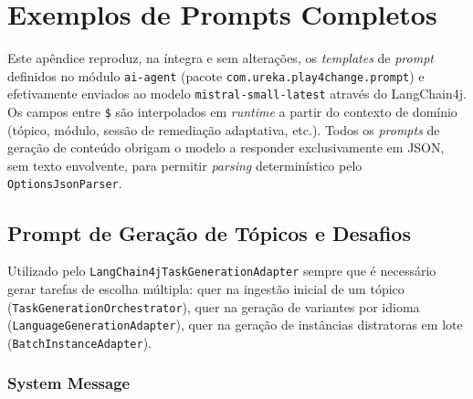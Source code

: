 %
%
\chapter{Exemplos de Prompts Completos} \label{ap:prompts}

Este apêndice reproduz, na íntegra e sem alterações, os \textit{templates} de \textit{prompt} definidos no módulo \texttt{ai-agent} (pacote \texttt{com.ureka.play4change.prompt}) e efetivamente enviados ao modelo \texttt{mistral-small-latest} através do LangChain4j. Os campos entre \texttt{\$} são interpolados em \textit{runtime} a partir do contexto de domínio (tópico, módulo, sessão de remediação adaptativa, etc.). Todos os \textit{prompts} de geração de conteúdo obrigam o modelo a responder exclusivamente em JSON, sem texto envolvente, para permitir \textit{parsing} determinístico pelo \texttt{OptionsJsonParser}.

\section{Prompt de Geração de Tópicos e Desafios} \label{ap:prompt-task-generation}

Utilizado pelo \texttt{LangChain4jTaskGenerationAdapter} sempre que é necessário gerar tarefas de escolha múltipla: quer na ingestão inicial de um tópico (\texttt{TaskGenerationOrchestrator}), quer na geração de variantes por idioma (\texttt{LanguageGenerationAdapter}), quer na geração de instâncias distratoras em lote (\texttt{BatchInstanceAdapter}).

\subsection*{System Message}

